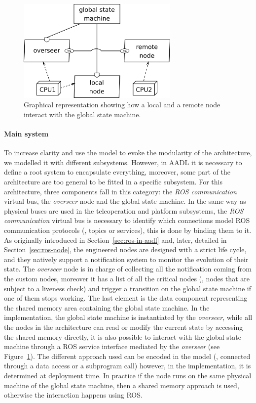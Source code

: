 \begin{figure}[t]
\centering
\includegraphics[width=0.7\textwidth]{gfx/pmk/overseer}
\caption{Graphical representation showing how a local and a remote node interact with the global state machine.}
\label{fig:pmk-gsm}
\end{figure}

\paragraph{Main system} To increase clarity and use the model to evoke the modularity of the architecture, we modelled it with different subsystems. However, in AADL it is necessary to define a root system to encapsulate everything, moreover, some part of the architecture are too general to be fitted in a specific subsystem. For this architecture, three components fall in this category: the \textit{ROS communication} virtual bus, the \textit{overseer} node and the global state machine. In the same way as physical buses are used in the teleoperation and platform subsystems, the \textit{ROS communication} virtual bus is necessary to identify which connections model ROS communication protocols (\ie, topics or services), this is done by binding them to it. As originally introduced in Section~\ref{sec:ros-in-aadl} and, later, detailed in Section~\ref{sec:ros-node}, the engineered nodes are designed with a strict life cycle, and they natively support a notification system to monitor the evolution of their state. The \textit{overseer} node is in charge of collecting all the notification coming from the custom nodes, moreover it has a list of all the critical nodes (\ie, nodes that are subject to a liveness check) and trigger a transition on the global state machine if one of them stops working. The last element is the data component representing the shared memory area containing the global state machine. In the implementation, the global state machine is instantiated by the \textit{overseer}, while all the nodes in the architecture can read or modify the current state by accessing the shared memory directly, it is also possible to interact with the global state machine through a ROS service interface mediated by the \textit{overseer} (see Figure~\ref{fig:pmk-gsm}). The different approach used can be encoded in the model (\ie, connected through a data access or a subprogram call) however, in the implementation, it is determined at deployment time. In practice if the node runs on the same physical machine of the global state machine, then a shared memory approach is used, otherwise the interaction happens using ROS. 

